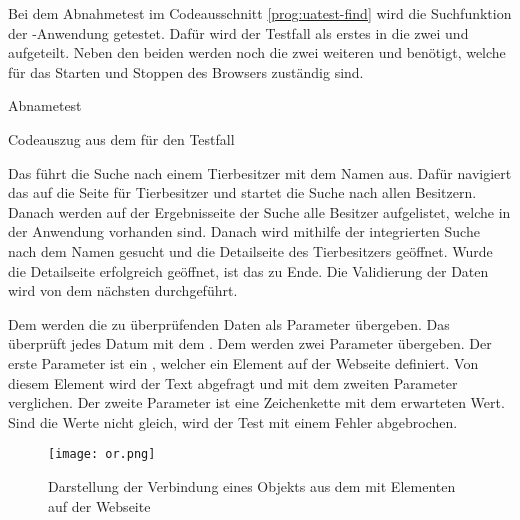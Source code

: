 Bei dem  Abnahmetest im Codeausschnitt \ref{prog:uatest-find} wird die Suchfunktion der -Anwendung getestet. Dafür wird der Testfall als erstes in die zwei   und  aufgeteilt. Neben den beiden  werden noch die zwei weiteren   und   benötigt, welche für das Starten und Stoppen des Browsers zuständig sind. 

\begin{program}

\caption{Abnametest }
\label{prog:uatest-find}
\end{program}


\begin{program}

\caption{Codeauszug aus dem  für den Testfall }
\label{prog:or-find}
\end{program}

\SuperPar
Das   führt die Suche nach einem Tierbesitzer mit dem Namen  aus. Dafür navigiert das  auf die Seite für Tierbesitzer und startet die Suche nach allen Besitzern. Danach werden auf der Ergebnisseite der Suche alle Besitzer aufgelistet, welche in der Anwendung vorhanden sind. Danach wird mithilfe der integrierten Suche nach dem Namen  gesucht und die Detailseite des Tierbesitzers geöffnet. Wurde die Detailseite erfolgreich geöffnet, ist das  zu Ende. Die Validierung der Daten wird von dem nächsten   durchgeführt.

\SuperPar
Dem   werden die zu überprüfenden Daten als Parameter übergeben. Das  überprüft jedes Datum mit dem  . Dem  werden zwei Parameter übergeben. Der erste Parameter ist ein , welcher ein Element auf der Webseite definiert. Von diesem Element wird der Text abgefragt und mit dem zweiten Parameter verglichen. Der zweite Parameter ist eine Zeichenkette mit dem erwarteten Wert. Sind die Werte nicht gleich, wird der Test mit einem Fehler abgebrochen. 

\begin{figure}
\centering
\texttt{[image: or.png]}
\caption{Darstellung der Verbindung eines Objekts aus dem  mit Elementen auf der Webseite}
\label{fig:orwebsite}
\end{figure}

